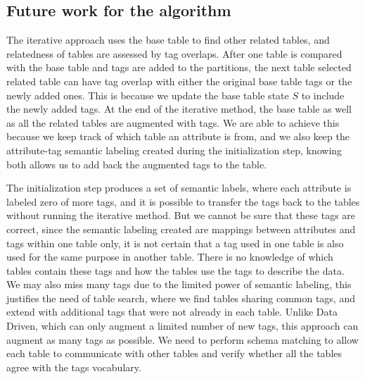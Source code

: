 \subsection{Future work for the algorithm}
\label{ssec:FutureWorkForTheAlgorithm}

The iterative approach uses the base table to find other related tables, and relatedness of tables are assessed by tag overlaps. After one table is compared with the base table and tags are added to the partitions, the next table selected related table can have tag overlap with either the original base table tags or the newly added ones. This is because we update the base table state $S$ to include the newly added tags. At the end of the iterative method, the base table as well as all the related tables are augmented with tags. We are able to achieve this because we keep track of which table an attribute is from, and we also keep the attribute-tag semantic labeling created during the initialization step, knowing both allows us to add back the augmented tags to the table.

The initialization step produces a set of semantic labels, where each attribute is labeled zero of more tags, and it is possible to transfer the tags back to the tables without running the iterative method. But we cannot be sure that these tags are correct, since the semantic labeling created are mappings between attributes and tags within one table only, it is not certain that a tag used in one table is also used for the same purpose in another table. There is no knowledge of which tables contain these tags and how the tables use the tags to describe the data. We may also miss many tags due to the limited power of semantic labeling, this justifies the need of table search, where we find tables sharing common tags, and extend with additional tags that were not already in each table. Unlike Data Driven, which can only augment a limited number of new tags, this approach can augment as many tags as possible. We need to perform schema matching to allow each table to communicate with other tables and verify whether all the tables agree with the tags vocabulary.

